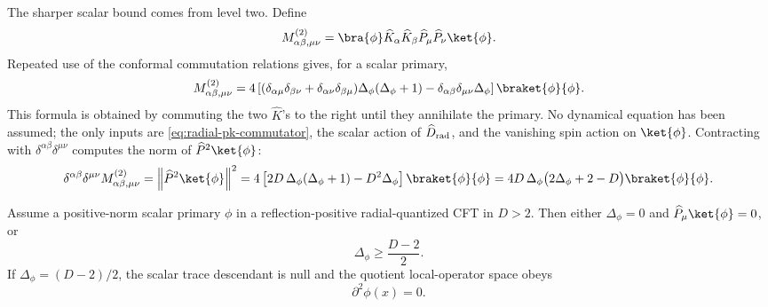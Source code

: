 The sharper scalar bound comes from level two.  Define
\[
  M^{(2)}_{\alpha\beta,\mu\nu}
  =
  \bra{\phi}
  \widehat K_\alpha\widehat K_\beta
  \widehat P_\mu\widehat P_\nu
  \ket{\phi}.
\]
Repeated use of the conformal commutation relations gives, for a scalar
primary,
\begin{equation}
  M^{(2)}_{\alpha\beta,\mu\nu}
  =
  4\left[
    (\delta_{\alpha\mu}\delta_{\beta\nu}
    +\delta_{\alpha\nu}\delta_{\beta\mu})
    \Delta_\phi(\Delta_\phi+1)
    -
    \delta_{\alpha\beta}\delta_{\mu\nu}\Delta_\phi
  \right]\braket{\phi}{\phi}.
  \label{eq:scalar-level-two-gram}
\end{equation}
This formula is obtained by commuting the two \(\widehat K\)'s to the right
until they annihilate the primary.  No dynamical equation has been assumed; the
only inputs are \eqref{eq:radial-pk-commutator}, the scalar action of
\(\widehat D_{\rm rad}\), and the vanishing spin action on \(\ket{\phi}\).
Contracting with \(\delta^{\alpha\beta}\delta^{\mu\nu}\) computes the norm of
\(\widehat P^2\ket{\phi}\):
\begin{equation}
  \delta^{\alpha\beta}\delta^{\mu\nu}
  M^{(2)}_{\alpha\beta,\mu\nu}
  =
  \left\|\widehat P^2\ket{\phi}\right\|^2
  =
  4\left[
    2D\,\Delta_\phi(\Delta_\phi+1)-D^2\Delta_\phi
  \right]\braket{\phi}{\phi}
  =
  4D\,\Delta_\phi\bigl(2\Delta_\phi+2-D\bigr)
  \braket{\phi}{\phi}.
  \label{eq:scalar-laplacian-descendant-norm}
\end{equation}
\begin{theorem}
\label{thm:scalar-unitarity-bound-shortening}
Assume a positive-norm scalar primary \(\phi\) in a reflection-positive
radial-quantized CFT in \(D>2\).  Then either \(\Delta_\phi=0\) and
\(\widehat P_\mu\ket{\phi}=0\), or
\begin{equation}
  \Delta_\phi\ge\frac{D-2}{2}.
  \label{eq:scalar-unitarity-bound}
\end{equation}
If \(\Delta_\phi=(D-2)/2\), the scalar trace descendant is null and the
quotient local-operator space obeys
\begin{equation}
  \partial^2\phi(x)=0.
  \label{eq:scalar-shortening-laplace}
\end{equation}
\end{theorem}

